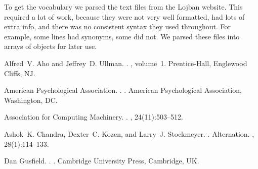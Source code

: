 \documentclass[11pt,letterpaper]{article}
\begin{document}
	To get the vocabulary we parsed the text files from the Lojban website.  This required a lot of work, because they were not very well formatted, had lots of extra info, and there was no consistent syntax they used throughout.  For example, some lines had synonyms, some did not.  We parsed these files into arrays of objects for later use.
\begin{thebibliography}{}

Alfred~V. Aho and Jeffrey~D. Ullman.
.
, volume~1.
\newblock Prentice-{Hall}, Englewood Cliffs, NJ.

{American Psychological Association}.
.
.
\newblock American Psychological Association, Washington, DC.

{Association for Computing Machinery}.
.
, 24(11):503--512.

Ashok~K. Chandra, Dexter~C. Kozen, and Larry~J. Stockmeyer.
.
\newblock Alternation.
,
  28(1):114--133.

Dan Gusfield.
.
.
\newblock Cambridge University Press, Cambridge, UK.

\end{thebibliography}
\end{document}
